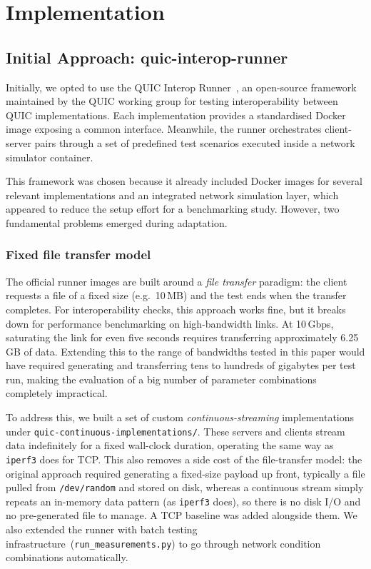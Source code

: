 \chapter{Implementation}
\label{chapter:implementation}

\section{Initial Approach: quic-interop-runner}
\label{sec:impl-interop-runner}

Initially, we opted to use the QUIC Interop Runner~\cite{quic-interop-runner},
an open-source framework maintained by the QUIC working group for testing
interoperability between QUIC implementations. Each implementation provides a
standardised Docker image exposing a common interface. Meanwhile, the runner orchestrates
client-server pairs through a set of predefined test scenarios executed inside a
network simulator container.

This framework was chosen because it already included Docker images for
several relevant implementations and an integrated network simulation layer,
which appeared to reduce the setup effort for a benchmarking study. However,
two fundamental problems emerged during adaptation.

\subsection{Fixed file transfer model}
\label{subsec:file-transfer-model}

The official runner images are built around a \textit{file transfer} paradigm:
the client requests a file of a fixed size (e.g.\ 10\,MB) and the test ends
when the transfer completes. For interoperability checks, this approach works fine,
but it breaks down for performance benchmarking on high-bandwidth links. At
10\,Gbps, saturating the link for even five seconds requires transferring
approximately 6.25\,GB of data. Extending this to the range of bandwidths
tested in this paper would have required generating and transferring tens to
hundreds of gigabytes per test run, making the evaluation of a big number of
parameter combinations completely impractical.

To address this, we built a set of custom \textit{continuous-streaming}
implementations under \texttt{quic-\allowbreak continuous-\allowbreak implementations/}.
These servers and clients stream data indefinitely for a fixed wall-clock duration,
operating the same way as \texttt{iperf3} does for TCP. This also removes a side
cost of the file-transfer model: the original approach required generating a
fixed-size payload up front, typically a file pulled from \texttt{/dev/random}
and stored on disk, whereas a continuous stream simply repeats an in-memory data
pattern (as \texttt{iperf3} does), so there is no disk I/O and no pre-generated
file to manage. A TCP baseline was added alongside them. We also extended the
runner with batch testing infrastructure\
(\texttt{run\_measurements.py}) to go through network condition combinations
automatically.

